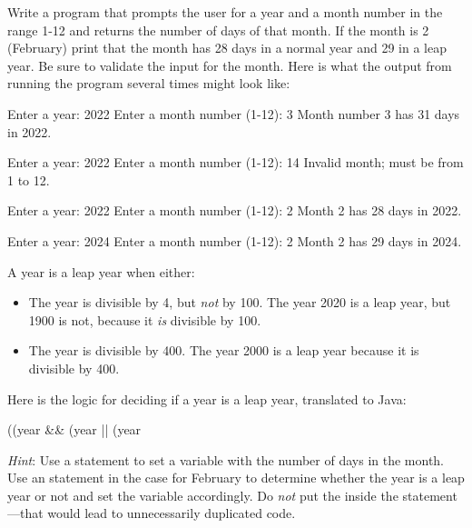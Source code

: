 \begin{exercise}
Write a program that prompts the user for a year and a month number in the range 1-12 and returns the number of days of that month. If the month is 2 (February) print that the month has 28 days in a normal year and 29 in a leap year. Be sure to validate the input for the month.  Here is what the output from running the program several times might look like:

\begin{stdout}
Enter a year: 2022
Enter a month number (1-12): 3
Month number 3 has 31 days in 2022.

Enter a year: 2022
Enter a month number (1-12): 14
Invalid month; must be from 1 to 12.

Enter a year: 2022
Enter a month number (1-12): 2
Month 2 has 28 days in 2022.

Enter a year: 2024
Enter a month number (1-12): 2
Month 2 has 29 days in 2024.

\end{stdout}

A year is a leap year when either:

\begin{itemize}
\item The year is divisible by 4, but {\em not} by 100. The year 2020 is a leap
year, but 1900 is not, because it {\em is} divisible by 100.
\item The year is divisible by 400.  The year 2000 is a leap year because it is
divisible by 400.
\end{itemize}

Here is the logic for deciding if a year is a leap year, translated to Java:

\begin{code}
((year %
&& (year %
|| (year %
\end{code}

{\em Hint}: Use a  statement to set a variable with the number of days in the month. Use an  statement in the case for February to determine whether the year is a leap year or not and set the variable accordingly. Do {\em not} put the  inside the  statement---that would lead to unnecessarily duplicated code.

\end{exercise}

